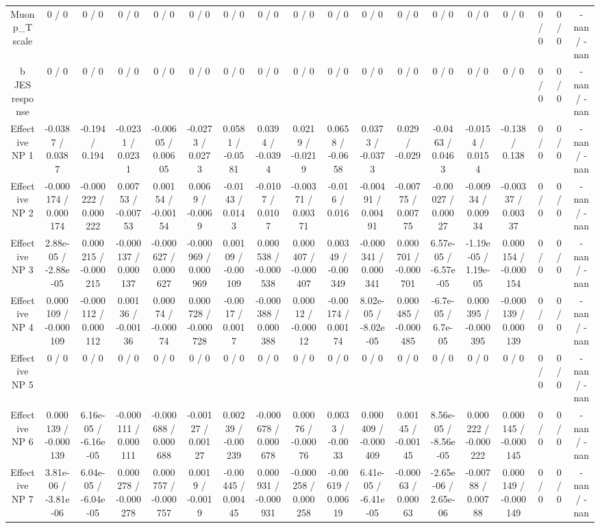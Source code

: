 \documentclass[10pt]{article}
\begin{document}
\begin{table}[htbp]
\begin{center}
\begin{tabular}{|c|c|c|c|c|c|c|c|c|c|c|c|c|c|c|c|c|c|}
  Muon p_{T} scale & 0 / 0 & 0 / 0 & 0 / 0 & 0 / 0 & 0 / 0 & 0 / 0 & 0 / 0 & 0 / 0 & 0 / 0 & 0 / 0 & 0 / 0 & 0 / 0 & 0 / 0 & 0 / 0 & 0 / 0 & 0 / 0 & -nan / -nan \\ 
  b JES response & 0 / 0 & 0 / 0 & 0 / 0 & 0 / 0 & 0 / 0 & 0 / 0 & 0 / 0 & 0 / 0 & 0 / 0 & 0 / 0 & 0 / 0 & 0 / 0 & 0 / 0 & 0 / 0 & 0 / 0 & 0 / 0 & -nan / -nan \\ 
  Effective NP 1 & -0.0387 / 0.0387 & -0.194 / 0.194 & -0.0231 / 0.0231 & -0.00605 / 0.00605 & -0.0273 / 0.0273 & 0.0581 / -0.0581 & 0.0394 / -0.0394 & 0.0219 / -0.0219 & 0.0658 / -0.0658 & 0.0373 / -0.0373 & 0.029 / -0.029 & -0.0463 / 0.0463 & -0.0154 / 0.0154 & -0.138 / 0.138 & 0 / 0 & 0 / 0 & -nan / -nan \\ 
  Effective NP 2 & -0.000174 / 0.000174 & -0.000222 / 0.000222 & 0.00753 / -0.00753 & 0.00154 / -0.00154 & 0.0069 / -0.0069 & -0.0143 / 0.0143 & -0.0107 / 0.0107 & -0.00371 / 0.00371 & -0.016 / 0.016 & -0.00491 / 0.00491 & -0.00775 / 0.00775 & -0.00027 / 0.00027 & -0.00934 / 0.00934 & -0.00337 / 0.00337 & 0 / 0 & 0 / 0 & -nan / -nan \\ 
  Effective NP 3 & 2.88e-05 / -2.88e-05 & 0.000215 / -0.000215 & -0.000137 / 0.000137 & -0.000627 / 0.000627 & -0.000969 / 0.000969 & 0.00109 / -0.00109 & 0.000538 / -0.000538 & 0.000407 / -0.000407 & 0.00349 / -0.00349 & -0.000341 / 0.000341 & 0.000701 / -0.000701 & 6.57e-05 / -6.57e-05 & -1.19e-05 / 1.19e-05 & 0.000154 / -0.000154 & 0 / 0 & 0 / 0 & -nan / -nan \\ 
  Effective NP 4 & 0.000109 / -0.000109 & -0.000112 / 0.000112 & 0.00136 / -0.00136 & 0.00074 / -0.00074 & 0.000728 / -0.000728 & -0.0017 / 0.0017 & -0.000388 / 0.000388 & 0.00012 / -0.00012 & -0.00174 / 0.00174 & 8.02e-05 / -8.02e-05 & 0.000485 / -0.000485 & -6.7e-05 / 6.7e-05 & 0.000395 / -0.000395 & -0.000139 / 0.000139 & 0 / 0 & 0 / 0 & -nan / -nan \\ 
  Effective NP 5 & 0 / 0 & 0 / 0 & 0 / 0 & 0 / 0 & 0 / 0 & 0 / 0 & 0 / 0 & 0 / 0 & 0 / 0 & 0 / 0 & 0 / 0 & 0 / 0 & 0 / 0 & 0 / 0 & 0 / 0 & 0 / 0 & -nan / -nan \\ 
  Effective NP 6 & 0.000139 / -0.000139 & 6.16e-05 / -6.16e-05 & -0.000111 / 0.000111 & -0.000688 / 0.000688 & -0.00127 / 0.00127 & 0.00239 / -0.00239 & -0.000678 / 0.000678 & 0.00076 / -0.00076 & 0.0033 / -0.0033 & 0.000409 / -0.000409 & 0.00145 / -0.00145 & 8.56e-05 / -8.56e-05 & 0.000222 / -0.000222 & 0.000145 / -0.000145 & 0 / 0 & 0 / 0 & -nan / -nan \\ 
  Effective NP 7 & 3.81e-06 / -3.81e-06 & 6.04e-05 / -6.04e-05 & 0.000278 / -0.000278 & 0.000757 / -0.000757 & 0.0019 / -0.0019 & -0.00445 / 0.00445 & 0.000931 / -0.000931 & -0.000258 / 0.000258 & -0.00619 / 0.00619 & 6.41e-05 / -6.41e-05 & -0.00063 / 0.00063 & -2.65e-06 / 2.65e-06 & -0.00788 / 0.00788 & 0.000149 / -0.000149 & 0 / 0 & 0 / 0 & -nan / -nan \\ 

\end{tabular}
\end{center}
\end{table}
\end{document}
